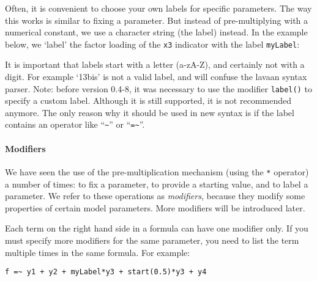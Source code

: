 Often, it is convenient to choose your own labels for specific
parameters. The way this works is similar to fixing a parameter. But
instead of pre-multiplying with a numerical constant, we use a character
string (the label) instead. In the example below, we `label' the factor
loading of the \texttt{x3} indicator with the label \texttt{myLabel}:

\begin{Shaded}
\begin{Highlighting}[]
\end{Highlighting}
\end{Shaded}

It is important that labels start with a letter (a-zA-Z), and certainly
not with a digit. For example `13bis' is not a valid label, and will
confuse the lavaan syntax parser. Note: before version 0.4-8, it was
necessary to use the modifier \texttt{label()} to specify a custom
label. Although it is still supported, it is not recommended anymore.
The only reason why it should be used in new syntax is if the label
contains an operator like ``\texttt{\textasciitilde{}}'' or
``\texttt{=\textasciitilde{}}''.

\hypertarget{modifiers}{%
\paragraph{Modifiers}\label{modifiers}}

We have seen the use of the pre-multiplication mechanism (using the
\texttt{*} operator) a number of times: to fix a parameter, to provide a
starting value, and to label a parameter. We refer to these operations
as \emph{modifiers}, because they modify some properties of certain
model parameters. More modifiers will be introduced later.

Each term on the right hand side in a formula can have one modifier
only. If you must specify more modifiers for the same parameter, you
need to list the term multiple times in the same formula. For example:

\begin{verbatim}
f =~ y1 + y2 + myLabel*y3 + start(0.5)*y3 + y4
\end{verbatim}

